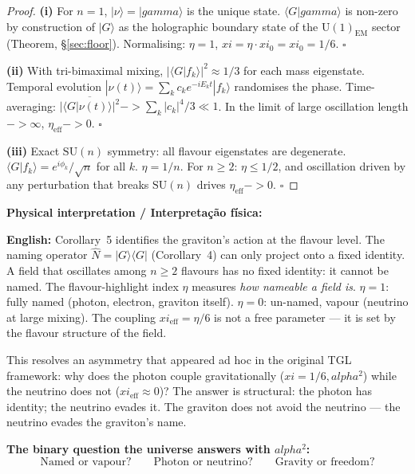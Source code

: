 \documentclass[12pt,a4paper]{article}
\def\to{ -> }%
\def\alpha{alpha}%
\def\gamma{gamma}%
\def\xi{xi}%
\begin{document}
\begin{proof}
\textbf{(i)} For $n=1$, $|\nu\rangle = |\gamma\rangle$ is the unique state. $\langle G|\gamma\rangle$ is non-zero by construction of $|G\rangle$ as the holographic boundary state of the $\mathrm{U}(1)_{\mathrm{EM}}$ sector (Theorem, §\ref{sec:floor}). Normalising: $\eta = 1$, $\xi = \eta\cdot\xi_0 = \xi_0 = 1/6$. $\square$

\textbf{(ii)} With tri-bimaximal mixing, $|\langle G|f_k\rangle|^2 \approx 1/3$ for each mass eigenstate. Temporal evolution $|\nu(t)\rangle = \sum_k c_k e^{-iE_k t}|f_k\rangle$ randomises the phase. Time-averaging: $\overline{|\langle G|\nu(t)\rangle|^2} \to \sum_k |c_k|^4/3 \ll 1$. In the limit of large oscillation length $\to \infty$, $\eta_{\mathrm{eff}} \to 0$. $\square$

\textbf{(iii)} Exact $\mathrm{SU}(n)$ symmetry: all flavour eigenstates are degenerate. $\langle G|f_k\rangle = e^{i\phi_k}/\sqrt{n}$ for all $k$. $\eta = 1/n$. For $n \geq 2$: $\eta \leq 1/2$, and oscillation driven by any perturbation that breaks $\mathrm{SU}(n)$ drives $\eta_{\mathrm{eff}} \to 0$. $\square$
\end{proof}

\noindent\textbf{Physical interpretation / Interpretação física:}

\medskip

\textbf{English:} Corollary~5 identifies the graviton's action at the flavour level. The naming operator $\hat{N} = |G\rangle\langle G|$ (Corollary~4) can only project onto a fixed identity. A field that oscillates among $n \geq 2$ flavours has no fixed identity: it cannot be named. The flavour-highlight index $\eta$ measures \emph{how nameable a field is}. $\eta = 1$: fully named (photon, electron, graviton itself). $\eta = 0$: un-named, vapour (neutrino at large mixing). The coupling $\xi_{\mathrm{eff}} = \eta/6$ is not a free parameter --- it is set by the flavour structure of the field.

This resolves an asymmetry that appeared ad hoc in the original TGL framework: why does the photon couple gravitationally ($\xi = 1/6, \alpha^2$) while the neutrino does not ($\xi_{\mathrm{eff}} \approx 0$)? The answer is structural: the photon has identity; the neutrino evades it. The graviton does not avoid the neutrino --- the neutrino evades the graviton's name.

\medskip

\textbf{The binary question the universe answers with $\alpha^2$:}
\begin{equation}
\text{Named or vapour?} \qquad
\text{Photon or neutrino?} \qquad
\text{Gravity or freedom?}
\end{equation}
\end{document}
